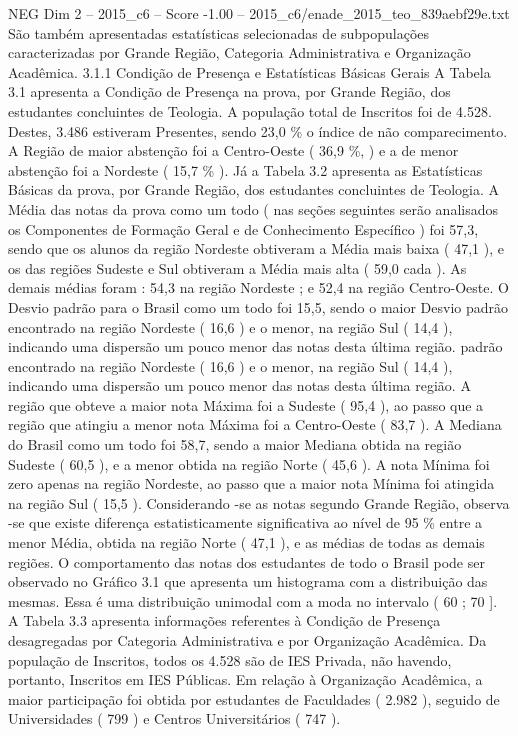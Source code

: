 \begin{textsample}{NEG Dim 2 – 2015\_c6 – Score -1.00 – 2015\_c6/enade\_2015\_teo\_839aebf29e.txt}
São também apresentadas estatísticas selecionadas de subpopulações caracterizadas por Grande Região, Categoria Administrativa e Organização Acadêmica. 3.1.1 Condição de Presença e Estatísticas Básicas Gerais A Tabela 3.1 apresenta a Condição de Presença na prova, por Grande Região, dos estudantes concluintes de Teologia.
A população total de Inscritos foi de 4.528.
Destes, 3.486 estiveram Presentes, sendo 23,0 \% o índice de não comparecimento.
A Região de maior abstenção foi a Centro-Oeste ( 36,9 \%, ) e a de menor abstenção foi a Nordeste ( 15,7 \% ).
Já a Tabela 3.2 apresenta as Estatísticas Básicas da prova, por Grande Região, dos estudantes concluintes de Teologia.
A Média das notas da prova como um todo ( nas seções seguintes serão analisados os Componentes de Formação Geral e de Conhecimento Específico ) foi 57,3, sendo que os alunos da região Nordeste obtiveram a Média mais baixa ( 47,1 ), e os das regiões Sudeste e Sul obtiveram a Média mais alta ( 59,0 cada ).
As demais médias foram : 54,3 na região Nordeste ; e 52,4 na região Centro-Oeste.
O Desvio padrão para o Brasil como um todo foi 15,5, sendo o maior Desvio padrão encontrado na região Nordeste ( 16,6 ) e o menor, na região Sul ( 14,4 ), indicando uma dispersão um pouco menor das notas desta última região. padrão encontrado na região Nordeste ( 16,6 ) e o menor, na região Sul ( 14,4 ), indicando uma dispersão um pouco menor das notas desta última região.
A região que obteve a maior nota Máxima foi a Sudeste ( 95,4 ), ao passo que a região que atingiu a menor nota Máxima foi a Centro-Oeste ( 83,7 ).
A Mediana do Brasil como um todo foi 58,7, sendo a maior Mediana obtida na região Sudeste ( 60,5 ), e a menor obtida na região Norte ( 45,6 ).
A nota Mínima foi zero apenas na região Nordeste, ao passo que a maior nota Mínima foi atingida na região Sul ( 15,5 ).
Considerando -se as notas segundo Grande Região, observa -se que existe diferença estatisticamente significativa ao nível de 95 \% entre a menor Média, obtida na região Norte ( 47,1 ), e as médias de todas as demais regiões.
O comportamento das notas dos estudantes de todo o Brasil pode ser observado no Gráfico 3.1 que apresenta um histograma com a distribuição das mesmas.
Essa é uma distribuição unimodal com a moda no intervalo ( 60 ; 70 ].
A Tabela 3.3 apresenta informações referentes à Condição de Presença desagregadas por Categoria Administrativa e por Organização Acadêmica.
Da população de Inscritos, todos os 4.528 são de IES Privada, não havendo, portanto, Inscritos em IES Públicas.
Em relação à Organização Acadêmica, a maior participação foi obtida por estudantes de Faculdades ( 2.982 ), seguido de Universidades ( 799 ) e Centros Universitários ( 747 ).

\end{textsample}
